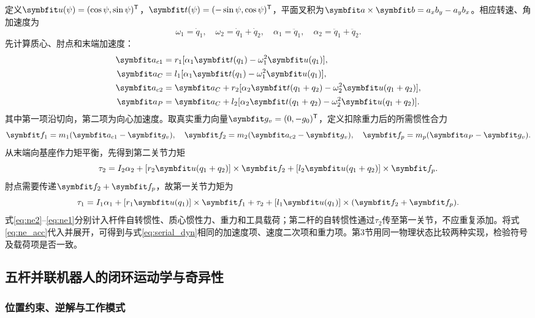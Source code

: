 定义$\vect u(\psi)=(\cos\psi,\sin\psi)^\T$，$\vect t(\psi)=(-\sin\psi,\cos\psi)^\T$，平面叉积为$\vect a\times\vect b=a_xb_y-a_yb_x$。相应转速、角加速度为
\begin{equation}
\omega_1=\dot q_1,\quad\omega_2=\dot q_1+\dot q_2,\quad
\alpha_1=\ddot q_1,\quad\alpha_2=\ddot q_1+\ddot q_2.
\end{equation}
先计算质心、肘点和末端加速度：
\begin{align}
\vect a_{c1}&=r_1[\alpha_1\vect t(q_1)-\omega_1^2\vect u(q_1)],\\
\vect a_C&=l_1[\alpha_1\vect t(q_1)-\omega_1^2\vect u(q_1)],\\
\vect a_{c2}&=\vect a_C+r_2[\alpha_2\vect t(q_1+q_2)-\omega_2^2\vect u(q_1+q_2)],\\
\vect a_P&=\vect a_C+l_2[\alpha_2\vect t(q_1+q_2)-\omega_2^2\vect u(q_1+q_2)].
\label{eq:ne_acc}
\end{align}
其中第一项沿切向，第二项为向心加速度。取真实重力向量$\vect g_v=(0,-g_0)^\T$，定义扣除重力后的所需惯性合力
\begin{equation}
\vect f_1=m_1(\vect a_{c1}-\vect g_v),\quad
\vect f_2=m_2(\vect a_{c2}-\vect g_v),\quad
\vect f_p=m_p(\vect a_P-\vect g_v).
\end{equation}
从末端向基座作力矩平衡，先得到第二关节力矩
\begin{equation}
\tau_2=I_2\alpha_2+[r_2\vect u(q_1+q_2)]\times\vect f_2
+[l_2\vect u(q_1+q_2)]\times\vect f_p.
\label{eq:ne2}
\end{equation}
肘点需要传递$\vect f_2+\vect f_p$，故第一关节力矩为
\begin{equation}
\tau_1=I_1\alpha_1+[r_1\vect u(q_1)]\times\vect f_1
+\tau_2+[l_1\vect u(q_1)]\times(\vect f_2+\vect f_p).
\label{eq:ne1}
\end{equation}
式\eqref{eq:ne2}--\eqref{eq:ne1}分别计入杆件自转惯性、质心惯性力、重力和工具载荷；第二杆的自转惯性通过$\tau_2$传至第一关节，不应重复添加。将式\eqref{eq:ne_acc}代入并展开，可得到与式\eqref{eq:serial_dyn}相同的加速度项、速度二次项和重力项。第3节用同一物理状态比较两种实现，检验符号及载荷项是否一致。

\subsection{五杆并联机器人的闭环运动学与奇异性}
\label{sec:parallel}

\subsubsection{位置约束、逆解与工作模式}

